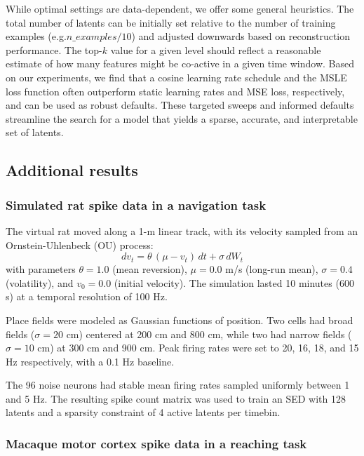 While optimal settings are data-dependent, we offer some general heuristics. The total number of latents can be initially set relative to the number of training examples (e.g.$n\_examples / 10$) and adjusted downwards based on reconstruction performance. The top-$k$ value for a given level should reflect a reasonable estimate of how many features might be co-active in a given time window. Based on our experiments, we find that a cosine learning rate schedule and the MSLE loss function often outperform static learning rates and MSE loss, respectively, and can be used as robust defaults. These targeted sweeps and informed defaults streamline the search for a model that yields a sparse, accurate, and interpretable set of latents.

\subsection{Additional results}

\subsubsection{Simulated rat spike data in a navigation task}
\label{subsubsection:synthetic_results_details}

The virtual rat moved along a 1-m linear track, with its velocity sampled from an Ornstein-Uhlenbeck (OU) process:
$$
dv_t = \theta \, (\mu - v_t) \, dt + \sigma \, dW_t
$$
with parameters $\theta = 1.0$ (mean reversion), $\mu = 0.0$ m/s (long-run mean), $\sigma = 0.4$ (volatility), and $v_0=0.0$ (initial velocity). The simulation lasted 10 minutes (600 s) at a temporal resolution of 100 Hz.

Place fields were modeled as Gaussian functions of position. Two cells had broad fields ($\sigma = 20$ cm) centered at 200 cm and 800 cm, while two had narrow fields ($\sigma = 10$ cm) at 300 cm and 900 cm. Peak firing rates were set to 20, 16, 18, and 15 Hz respectively, with a 0.1 Hz baseline.

The 96 noise neurons had stable mean firing rates sampled uniformly between 1 and 5 Hz. The resulting spike count matrix was used to train an SED with 128 latents and a sparsity constraint of 4 active latents per timebin.

\subsubsection{Macaque motor cortex spike data in a reaching task}
\label{subsubsection:churchland_results_details}

